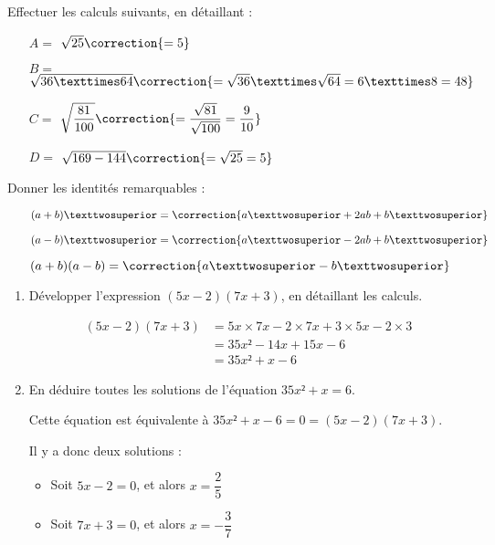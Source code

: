 \documentclass[
	classe=$2^{de}$,
]{évaluation}
\begin{document}
\begin{exercice}[2]
	Effectuer les calculs suivants, en détaillant :
	\begin{enumerate}
		\item[$A =$] $\sqrt{25} \correction{ = 5}$
		\item[$B =$] $\sqrt{36 × 64} \correction{ = \sqrt{36} × \sqrt{64} = 6 × 8 = 48}$
		\item[$C =$] $\sqrt{\dfrac{81}{100}} \correction{ = \dfrac{\sqrt{81}}{\sqrt{100}} = \dfrac{9}{10}}$
		\item[$D =$] $\sqrt{169 - 144} \correction{ = \sqrt{25} = 5}$
	\end{enumerate}
\end{exercice}

\begin{exercice}[1,5]
	Donner les identités remarquables :
	\begin{enumerate}
		\item[\circled{1}] $(a + b)² = \correction{a² + 2ab + b²}$
		\item[\circled{2}] $(a - b)² = \correction{a² - 2ab + b²}$
		\item[\circled{3}] $(a + b)(a - b) = \correction{a² - b²}$
	\end{enumerate}
\end{exercice}

\begin{exercice}[2,5]
	\begin{enumerate}
		\item Développer l'expression $(5x - 2)(7x + 3)$, en détaillant les calculs.

			      {\color{red}
				      \begin{align*}
					      (5x - 2)(7x + 3) & = 5x×7x - 2×7x + 3×5x - 2×3 \\
					                       & = 35x² - 14x + 15x - 6      \\
					                       & = 35x² + x - 6
				      \end{align*}}
		\item En déduire toutes les solutions de l'équation $35x² + x = 6$.

			      {\color{red}Cette équation est équivalente à $35x² + x - 6 = 0 = (5x - 2)(7x + 3)$.

				      Il y a donc deux solutions :
				      \begin{itemize}
					      \item Soit $5x - 2 = 0$, et alors $x = \dfrac{2}{5}$
					      \item Soit $7x + 3 = 0$, et alors $x = -\dfrac{3}{7}$
				      \end{itemize}}
	\end{enumerate}
\end{exercice}
\end{document}

